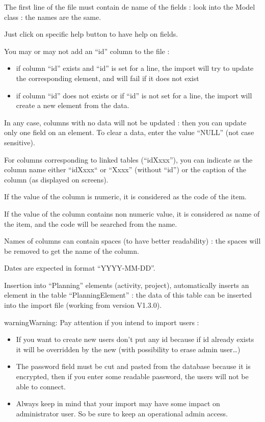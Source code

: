 \documentclass[letterpaper,10pt,english]{sphinxmanual}
\begin{document}
The first line of the file must contain de name of the fields : look into the Model class : the names are the same.

Just click on specific help button  to have help on fields.

You may or may not add an ``id'' column to the file :
\begin{itemize}
\item {} 
if column ``id'' exists and ``id'' is set for a line, the import will try to update the corresponding element, and will fail if it does not exist

\item {} 
if column ``id'' does not exists or if ``id'' is not set for a line, the import will create a new element from the data.

\end{itemize}

In any case, columns with no data will not be updated : then you can update only one field on an element. To clear a data, enter the value ``NULL'' (not case sensitive).

For columns corresponding to linked tables (``idXxxx''), you can indicate as the column name  either ``idXxxx“ or “Xxxx'' (without ``id'') or the caption of the column (as displayed on screens).

If the value of the column is numeric, it is considered as the code of the item.

If the value of the column contains non numeric value, it is considered as name of the item, and the code will be searched from the name.

Names of columns can contain spaces (to have better readability) : the spaces will be removed to get the name of the column.

Dates are expected in format “YYYY-MM-DD”.

Insertion into ``Planning'' elements (activity, project), automatically inserts an element in the table “PlanningElement” : the data of this table can be inserted into the import file (working from version V1.3.0).

\begin{notice}{warning}{Warning:}
Pay attention if you intend to import users :
\begin{itemize}
\item {} 
If you want to create new users don't put any id because if id already exists it will be overridden by the new (with possibility to erase admin user…)

\item {} 
The password field must be cut and pasted from the database because it is encrypted, then if you enter some readable password, the users will not be able to connect.

\item {} 
Always keep in mind that your import may have some impact on administrator user. So be sure to keep an operational admin access.

\end{itemize}
\end{notice}
\end{document}
